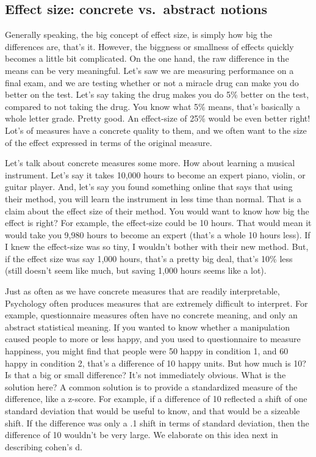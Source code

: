 \documentclass[
  letterpaper,
  DIV=11,
  numbers=noendperiod]{scrreprt}
\begin{document}
\subsection{Effect size: concrete vs.~abstract
notions}\label{effect-size-concrete-vs.-abstract-notions-1}

Generally speaking, the big concept of effect size, is simply how big
the differences are, that's it. However, the biggness or smallness of
effects quickly becomes a little bit complicated. On the one hand, the
raw difference in the means can be very meaningful. Let's saw we are
measuring performance on a final exam, and we are testing whether or not
a miracle drug can make you do better on the test. Let's say taking the
drug makes you do 5\% better on the test, compared to not taking the
drug. You know what 5\% means, that's basically a whole letter grade.
Pretty good. An effect-size of 25\% would be even better right! Lot's of
measures have a concrete quality to them, and we often want to the size
of the effect expressed in terms of the original measure.

Let's talk about concrete measures some more. How about learning a
musical instrument. Let's say it takes 10,000 hours to become an expert
piano, violin, or guitar player. And, let's say you found something
online that says that using their method, you will learn the instrument
in less time than normal. That is a claim about the effect size of their
method. You would want to know how big the effect is right? For example,
the effect-size could be 10 hours. That would mean it would take you
9,980 hours to become an expert (that's a whole 10 hours less). If I
knew the effect-size was so tiny, I wouldn't bother with their new
method. But, if the effect size was say 1,000 hours, that's a pretty big
deal, that's 10\% less (still doesn't seem like much, but saving 1,000
hours seems like a lot).

Just as often as we have concrete measures that are readily
interpretable, Psychology often produces measures that are extremely
difficult to interpret. For example, questionnaire measures often have
no concrete meaning, and only an abstract statistical meaning. If you
wanted to know whether a manipulation caused people to more or less
happy, and you used to questionnaire to measure happiness, you might
find that people were 50 happy in condition 1, and 60 happy in condition
2, that's a difference of 10 happy units. But how much is 10? Is that a
big or small difference? It's not immediately obvious. What is the
solution here? A common solution is to provide a standardized measure of
the difference, like a z-score. For example, if a difference of 10
reflected a shift of one standard deviation that would be useful to
know, and that would be a sizeable shift. If the difference was only a
.1 shift in terms of standard deviation, then the difference of 10
wouldn't be very large. We elaborate on this idea next in describing
cohen's d.
\end{document}

